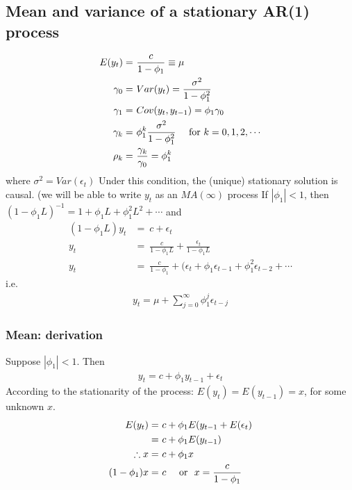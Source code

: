 \documentclass[a4paper,twoside,11pt]{article}
\begin{document}
\begin{shaded*}
\subsection{Mean and variance of a stationary AR(1) process}
\begin{equation*}
\begin{aligned}
E(y_t) =& \ \frac{c}{1-\phi_1} \equiv \mu \\
\gamma_0 =& \  Var(y_t) = \frac{\sigma^2}{ 1-\phi_1^2} \\
\gamma_1 =& \  Cov(y_t, y_{t-1}) = \phi_1 \gamma_0 \\
\gamma_k =& \ \phi_1^k \frac{\sigma^2}{1- \phi_1^2} \ \ \ \ \textmd{for} \ k=0,1,2,\cdots \\
\rho_k =& \ \frac{\gamma_k}{\gamma_0}=\phi_1^k \\
\end{aligned}
\end{equation*}
where $\sigma^2 = Var(\epsilon_t)$
\newline
Under this condition, the (unique) stationary solution is causal. (we will be able to write $y_t$ as an $MA(\infty)$ process
\newline
\newline
If $|\phi_1|<1$, then $(1-\phi_1 L)^{-1} = 1+ \phi_1 L + \phi_1^2 L^2 +\cdots$ and 
\begin{equation*}
\begin{aligned}
(1-\phi_1 L)y_t &= \ c+ \epsilon_t \\
y_t &= \  \frac{c}{1- \phi_1 L}+\frac{\epsilon_t}{1-\phi_1L} \\
y_t &= \ \frac{c}{1-\phi_1} + (\epsilon_t + \phi_1 \epsilon_{t-1} + \phi_1^2 \epsilon_{t-2} + \cdots
\end{aligned}
\end{equation*}
i.e. 
\begin{equation*}
\begin{aligned}
y_t = \mu + \sum^\infty_{j=0} \phi_1^j \epsilon_{t-j}
\end{aligned}
\end{equation*}
\end{shaded*}
\subsubsection{Mean: derivation}
Suppose $|\phi_1|<1$. Then
\begin{equation*}
\begin{aligned}
y_t = c + \phi_1 y_{t-1} +\epsilon_t
\end{aligned}
\end{equation*}
According to the stationarity of the process: $E(y_t)=E(y_{t-1})=x$, for some unknown $x$. 
\begin{equation*}
\begin{aligned}
E(y_t) =& \ c + \phi_1 E(y_{t-1} + E(\epsilon_t) \\
= & \ c + \phi_1 E(y_{t-1}) \\
\therefore x =& \ c + \phi_1 x \\
(1- \phi_1)x =& \ c \ \ \ \ \textmd{or} \ \ x = \frac{c}{1- \phi_1}
\end{aligned}
\end{equation*}
\end{document}
